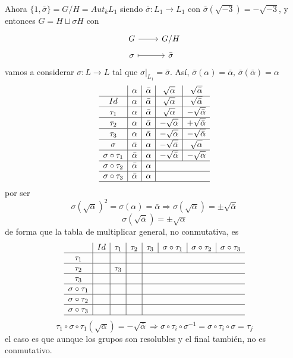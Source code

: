 \begin{dem}
    Ahora $\{1, \bar \sigma\} = G/H = Aut_k L_1$ siendo $\bar \sigma: L_1 \longrightarrow L_1$ con $\bar \sigma (\sqrt{-3}) = -\sqrt{-3}$, y entonces $G = H \sqcup \sigma H$ con 
    $$\bt G \rar & G/H \\[-5mm] \sigma \rarmaps & \bar \sigma \et$$
    vamos a considerar $\sigma : L \longrightarrow L$ tal que $\sigma |_{L_1} = \bar \sigma$. As\'i, $\bar \sigma(\alpha) = \bar \alpha, \, \bar \sigma(\bar \alpha) =  \alpha$
     $$\begin{array}{c|c|c|c|c}
        & \alpha & \bar \alpha & \sqrt{\alpha} & \sqrt{\bar \alpha} \\ \hline 
        Id &  \alpha &  \bar \alpha & \sqrt{\alpha} & \sqrt{\bar \alpha}\\\hline 
        \tau_1 & \alpha & \bar \alpha & \sqrt{\alpha} & -\sqrt{\bar \alpha}\\\hline 
        \tau_2 & \alpha & \bar \alpha & -\sqrt{\alpha} & +\sqrt{\bar \alpha} \\\hline 
        \tau_3 & \alpha & \bar \alpha & -\sqrt{\alpha} & - \sqrt{\bar \alpha}\\\hline 
        \sigma & \bar \alpha & \alpha & - \sqrt{\bar \alpha} &  \sqrt{\alpha} \\\hline
        \sigma \circ \tau_1 & \bar \alpha & \alpha & -\sqrt{\bar \alpha} & -\sqrt{\alpha} \\\hline
        \sigma \circ \tau_2 & \bar \alpha & \alpha  \\\hline
        \sigma \circ \tau_3 & \bar \alpha & \alpha  \\\hline 
    \end{array}$$
    por ser $$\sigma(\sqrt{\alpha})^2 = \sigma(\alpha) = \bar \alpha \Rightarrow \sigma(\sqrt{\alpha}) = \pm \sqrt{\bar \alpha}$$
    $$\sigma(\sqrt{\bar \alpha}) = \pm \sqrt{\alpha}$$
    de forma que la tabla de multiplicar general, no conmutativa, es $$\begin{array}{c|c|c|c|c|c|c|c}
        & Id & \tau_1 & \tau_2 & \tau_3 & \sigma \circ \tau_1 &\sigma \circ \tau_2 &\sigma \circ \tau_3 \\ \hline
        \tau_1 & & &  \\\hline 
        \tau_2 & & \tau_3 &  \\\hline 
        \tau_3 &  &  & \\\hline 
        \sigma \circ \tau_1 &  &  & \\\hline 
        \sigma \circ \tau_2 &  &  & \\\hline 
        \sigma \circ \tau_3 &  &  & \\\hline 
    \end{array}$$
    $$\tau_1 \circ \sigma \circ \tau_1 (\sqrt{\alpha}) = -\sqrt{\bar \alpha} \Rightarrow \sigma \circ \tau_i \circ \sigma^{-1} =\sigma \circ \tau_i \circ  \sigma = \tau_j$$
    el caso es que aunque los grupos son resolubles y el final tambi\'en, no es conmutativo. 
    \end{dem} 
